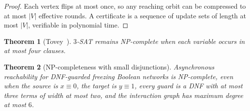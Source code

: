 \documentclass[final,3p,times]{elsarticle}
\newtheorem{theorem}{Theorem}
\theoremstyle{definition}
\theoremstyle{remark}
\begin{document}
\begin{proof}
Each vertex flips at most once, so any reaching orbit can be compressed to at most $|V|$ effective rounds.
A certificate is a sequence of update sets of length at most $|V|$, verifiable in polynomial time.
\end{proof}

\begin{theorem}[Tovey~\cite{tovey1984simplified}]\label{thm:tovey}
$3$-SAT remains NP-complete when each variable occurs in at most four clauses.
\end{theorem}

\begin{theorem}[NP-completeness with small disjunctions]\label{thm:np}
Asynchronous reachability for DNF-guarded freezing Boolean networks is NP-complete, even when the source is $x\equiv 0$, the target is $y\equiv 1$, every guard is a DNF with at most three terms of width at most two, and the interaction graph has maximum degree at most $6$.
\end{theorem}
\end{document}
